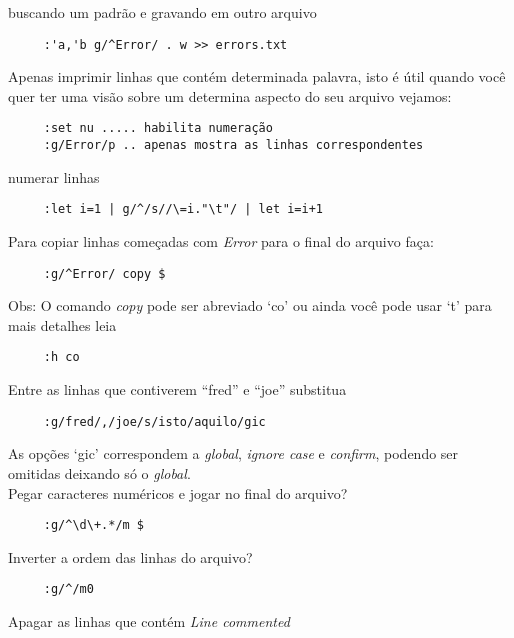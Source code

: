 buscando um padrão e gravando em outro arquivo

\begin{verbatim}
     :'a,'b g/^Error/ . w >> errors.txt
\end{verbatim}

Apenas imprimir linhas que contém determinada palavra, isto é útil 
quando você quer ter uma visão sobre um determina aspecto 
do seu arquivo vejamos:

\begin{verbatim}
     :set nu ..... habilita numeração 
     :g/Error/p .. apenas mostra as linhas correspondentes
\end{verbatim}

numerar linhas

\begin{verbatim}
     :let i=1 | g/^/s//\=i."\t"/ | let i=i+1
\end{verbatim}

Para copiar linhas começadas com {\em Error} para o final do arquivo faça:

\begin{verbatim}
     :g/^Error/ copy $
\end{verbatim}

Obs: O comando {\em copy} pode ser abreviado `co' ou ainda você pode usar `t'
para mais detalhes leia

\begin{verbatim}
     :h co
\end{verbatim}

Entre as linhas que contiverem ``fred'' e ``joe'' substitua

\begin{verbatim}
     :g/fred/,/joe/s/isto/aquilo/gic
\end{verbatim}

As opções `gic' correspondem a {\em global}, {\em ignore case} e {\em
confirm}, podendo ser omitidas deixando só o {\em global}. \\


Pegar caracteres numéricos e jogar no final do arquivo?

\begin{verbatim}
     :g/^\d\+.*/m $
\end{verbatim}

Inverter a ordem das linhas do arquivo?

\begin{verbatim}
     :g/^/m0
\end{verbatim}

Apagar as linhas que contém {\em Line commented}

